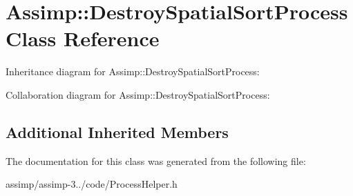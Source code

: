 \hypertarget{class_assimp_1_1_destroy_spatial_sort_process}{\section{Assimp\+:\+:Destroy\+Spatial\+Sort\+Process Class Reference}
\label{class_assimp_1_1_destroy_spatial_sort_process}
}


Inheritance diagram for Assimp\+:\+:Destroy\+Spatial\+Sort\+Process\+:


Collaboration diagram for Assimp\+:\+:Destroy\+Spatial\+Sort\+Process\+:
\subsection*{Additional Inherited Members}


The documentation for this class was generated from the following file\+:\begin{DoxyCompactItemize}
\item 
assimp/assimp-\/3../code/Process\+Helper.\+h\end{DoxyCompactItemize}
